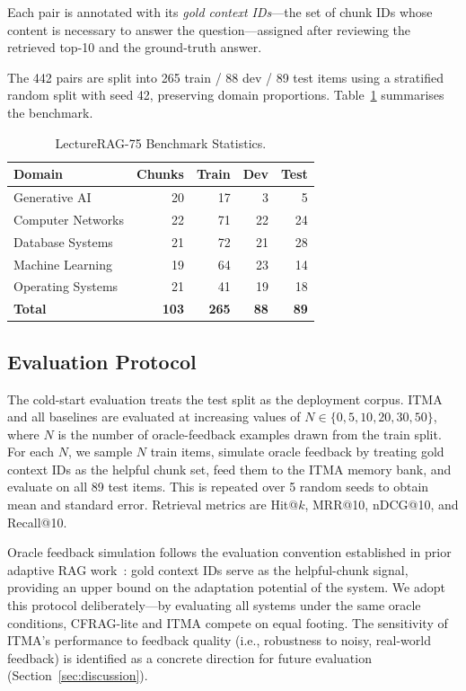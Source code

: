 \documentclass[journal]{IEEEtran}
\begin{document}
Each pair is annotated with its \emph{gold context IDs}---the set of chunk
IDs whose content is necessary to answer the question---assigned after
reviewing the retrieved top-10 and the ground-truth answer.

The 442 pairs are split into 265 train / 88 dev / 89 test items using a
stratified random split with seed 42, preserving domain proportions.
Table~\ref{tab:benchmark} summarises the benchmark.

\begin{table}[!htbp]
\centering
\caption{LectureRAG-75 Benchmark Statistics.}
\label{tab:benchmark}
\small
\begin{tabular}{lrrrr}
\toprule
Domain & Chunks & Train & Dev & Test \\
\midrule
Generative AI        & 20 &  17 &  3 &  5 \\
Computer Networks    & 22 &  71 & 22 & 24 \\
Database Systems     & 21 &  72 & 21 & 28 \\
Machine Learning     & 19 &  64 & 23 & 14 \\
Operating Systems    & 21 &  41 & 19 & 18 \\
\midrule
\textbf{Total}       & \textbf{103} & \textbf{265} & \textbf{88} & \textbf{89} \\
\bottomrule
\end{tabular}
\end{table}

\subsection{Evaluation Protocol}
The cold-start evaluation treats the test split as the deployment corpus.
ITMA and all baselines are evaluated at increasing values of
$N\in\{0,5,10,20,30,50\}$, where $N$ is the number of oracle-feedback
examples drawn from the train split.  For each $N$, we sample $N$ train
items, simulate oracle feedback by treating gold context IDs as the
helpful chunk set, feed them to the ITMA memory bank, and evaluate on all
89 test items.  This is repeated over 5 random seeds to obtain mean and
standard error.  Retrieval metrics are Hit@$k$, MRR@10, nDCG@10, and
Recall@10.

Oracle feedback simulation follows the evaluation convention established in
prior adaptive RAG work~\cite{cfrag2025}: gold context IDs serve as the
helpful-chunk signal, providing an upper bound on the adaptation potential
of the system.  We adopt this protocol deliberately---by evaluating all
systems under the same oracle conditions, CFRAG-lite and ITMA compete on
equal footing.  The sensitivity of ITMA's performance to feedback quality
(i.e., robustness to noisy, real-world feedback) is identified as a
concrete direction for future evaluation (Section~\ref{sec:discussion}).
\end{document}
